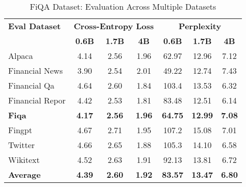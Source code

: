 
\begin{table}[h]
\centering
\caption[FiQA: Evaluation Results]{FiQA Dataset: Evaluation Across Multiple Datasets}
\label{tab:fiqa_results}
\begin{tabular}{l|ccc|ccc}
\hline
\textbf{Eval Dataset} & \multicolumn{3}{c|}{\textbf{Cross-Entropy Loss}} & \multicolumn{3}{c}{\textbf{Perplexity}} \\
\cline{2-4} \cline{5-7}
  & \textbf{0.6B} & \textbf{1.7B} & \textbf{4B} & \textbf{0.6B} & \textbf{1.7B} & \textbf{4B} \\
Alpaca & 4.14 & 2.56 & 1.96 & 62.97 & 12.96 & 7.12 \\
Financial News & 3.90 & 2.54 & 2.01 & 49.22 & 12.74 & 7.43 \\
Financial Qa & 4.64 & 2.60 & 1.84 & 103.4 & 13.53 & 6.32 \\
Financial Repor & 4.42 & 2.53 & 1.81 & 83.48 & 12.51 & 6.14 \\
\textbf{Fiqa} & \textbf{4.17} & \textbf{2.56} & \textbf{1.96} & \textbf{64.75} & \textbf{12.99} & \textbf{7.08} \\
Fingpt & 4.67 & 2.71 & 1.95 & 107.2 & 15.08 & 7.01 \\
Twitter & 4.66 & 2.65 & 1.88 & 105.3 & 14.10 & 6.58 \\
Wikitext & 4.52 & 2.63 & 1.91 & 92.13 & 13.81 & 6.72 \\
\hline
\textbf{Average} & \textbf{4.39} & \textbf{2.60} & \textbf{1.92} & \textbf{83.57} & \textbf{13.47} & \textbf{6.80} \\
\hline
\end{tabular}
\end{table}

